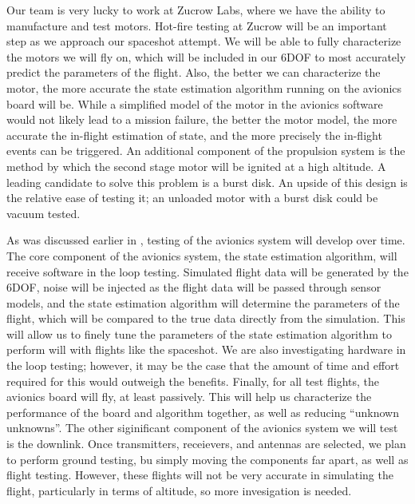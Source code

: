 Our team is very lucky to work at Zucrow Labs, where we have the ability to manufacture and test motors. Hot-fire testing at Zucrow will be an important step as we approach our spaceshot attempt. We will be able to fully characterize the motors we will fly on, which will be included in our 6DOF to most accurately predict the parameters of the flight. Also, the better we can characterize the motor, the more accurate the state estimation algorithm running on the avionics board will be. While a simplified model of the motor in the avionics software would not likely lead to a mission failure, the better the motor model, the more accurate the in-flight estimation of state, and the more precisely the in-flight events can be triggered. An additional component of the propulsion system is the method by which the second stage motor will be ignited at a high altitude. A leading candidate to solve this problem is a burst disk. An upside of this design is the relative ease of testing it; an unloaded motor with a burst disk could be vacuum tested.

As was discussed earlier in , testing of the avionics system will develop over time. The core component of the avionics system, the state estimation algorithm, will receive software in the loop testing. Simulated flight data will be generated by the 6DOF, noise will be injected as the flight data will be passed through sensor models, and the state estimation algorithm will determine the parameters of the flight, which will be compared to the true data directly from the simulation. This will allow us to finely tune the parameters of the state estimation algorithm to perform will with flights like the spaceshot. We are also investigating hardware in the loop testing; however, it may be the case that the amount of time and effort required for this would outweigh the benefits. Finally, for all test flights, the avionics board will fly, at least passively. This will help us characterize the performance of the board and algorithm together, as well as reducing ``unknown unknowns''. The other siginificant component of the avionics system we will test is the downlink. Once transmitters, receievers, and antennas are selected, we plan to perform ground testing, bu simply moving the components far apart, as well as flight testing. However, these flights will not be very accurate in simulating the flight, particularly in terms of altitude, so more invesigation is needed.

